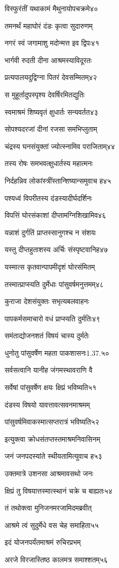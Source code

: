 विस्फुरंतीं यथाकामं मैथुनायोपचक्रमे४०

तमनर्थं महाघोरं दंडः कृत्वा सुदारुणम्

नगरं स्वं जगामाशु मदोन्मत्त इव द्विपः४१

भार्गवी रुदती दीना आश्रमस्याविदूरतः

प्रत्यपालयदुद्विग्ना पितरं देवसम्मितम्४२

स मुहूर्तादुपस्पृश्य देवर्षिरमितद्युतिः

स्वमाश्रमं शिष्यवृतं क्षुधार्तः सन्यवर्तत४३

सोपश्यदरजां दीनां रजसा समभिप्लुताम्

चंद्रस्य घनसंयुक्तां ज्योत्स्नामिव पराजिताम्४४

तस्य रोषः समभवत्क्षुधार्तस्य महात्मनः

निर्दहन्निव लोकांस्त्रींस्तान्शिष्यान्समुवाच ह४५

पश्यध्वं विपरीतस्य दंडस्यादीर्घदर्शिनः

विपत्तिं घोरसंकाशां दीप्तामग्निशिखामिव४६

यन्नाशं दुर्गतिं प्राप्तस्सानुगश्च न संशयः

यस्तु दीप्तहुताशस्य अर्चिः संस्पृष्टवानिह४७

यस्मात्स कृतवान्पापमीदृशं घोरसंमितम्

तस्मात्प्राप्स्यति दुर्मेधाः पांसुवर्षमनुत्तमम्४८

कुराजा देशसंयुक्तः सभृत्यबलवाहनः

पापकर्मसमाचारो वधं प्राप्स्यति दुर्मतिः४९

समंताद्योजनशतं विषयं चास्य दुर्मतेः

धुनोतु पांसुवर्षेण महता पाकशासनः1.37.५०

सर्वसत्वानि यानीह जंगमस्थावराणि वै

सर्वेषां पांसुवर्षेण क्षयः क्षिप्रं भविष्यति५१

दंडस्य विषयो यावत्तावत्सवनमाश्रमम्

पांसुवर्षमिवाकस्मात्सप्तरात्रं भविष्यति५२

इत्युक्त्वा क्रोधसंतप्तस्तमाश्रमनिवासिनम्

जनं जनपदस्यांते स्थीयतामित्युवाच ह५३

उक्तमात्रे उशनसा आश्रमावसथो जनः

क्षिप्रं तु विषयात्तस्मात्स्थानं चक्रे च बाह्यतः५४

तं तथोक्त्वा मुनिजनमरजामिदमब्रवीत्

आश्रमे त्वं सुदुर्मेधे वस चेह समाहिता५५

इदं योजनपर्यंतमाश्रमं रुचिरप्रभम्

अरजे विरजास्तिष्ठ कालमत्र समाश्शतम्५६

